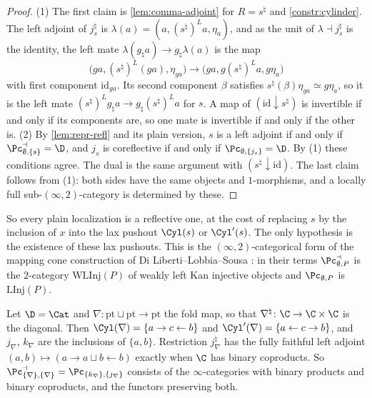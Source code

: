 \begin{proof}
(1) The first claim is \cref{lem:comma-adjoint} for $R = s^{\natural}$ and \cref{constr:cylinder}. The left adjoint of $j_{s}^{\natural}$ is $\lambda(a) = (a,(s^{\natural})^{L}a,\eta_{a})$, and as the unit of $\lambda \dashv j_{s}^{\natural}$ is the identity, the left mate $\lambda(g_{\natural}a) \to g_{\natural}\lambda(a)$ is the map
\[
\bigl(ga,(s^{\natural})^{L}(ga),\eta_{ga}\bigr) \to \bigl(ga,g(s^{\natural})^{L}a,g\eta_{a}\bigr)
\]
with first component $\mathrm{id}_{ga}$. Its second component $\beta$ satisfies $s^{\natural}(\beta)\eta_{ga} \simeq g\eta_{a}$, so it is the left mate $(s^{\natural})^{L}g_{\natural}a \to g_{\natural}(s^{\natural})^{L}a$ for $s$. A map of $(\mathrm{id} \downarrow s^{\natural})$ is invertible if and only if its components are, so one mate is invertible if and only if the other is.
(2) By \cref{lem:repr-refl} and its plain version, $s$ is a left adjoint if and only if $\Pc^{\dashv}_{\emptyset,\{s\}} = \D$, and $j_{s}$ is coreflective if and only if $\Pc_{\emptyset,\{j_{s}\}} = \D$. By (1) these conditions agree.
The dual is the same argument with $(s^{\natural} \downarrow \mathrm{id})$. The last claim follows from (1): both sides have the same objects and $1$-morphisms, and a locally full sub-$(\infty,2)$-category is determined by these.
\end{proof}

So every plain localization is a reflective one, at the cost of replacing $s$ by the inclusion of $x$ into the lax pushout $\Cyl(s)$ or $\Cyl'(s)$. The only hypothesis is the existence of these lax pushouts.
This is the $(\infty,2)$-categorical form of the mapping cone construction of Di Liberti--Lobbia--Sousa \cite[Proposition 1.14]{dilibertilobbiasousa2022kz}: in their terms $\Pc^{\dashv}_{\emptyset,P}$ is the $2$-category $\mathrm{WLInj}(P)$ of weakly left Kan injective objects and $\Pc_{\emptyset,P}$ is $\mathrm{LInj}(P)$.

\begin{exmp}
\label{ex:adjoin-products}
Let $\D = \Cat$ and $\nabla\colon \mathrm{pt} \sqcup \mathrm{pt} \to \mathrm{pt}$ the fold map, so that $\nabla^{\natural}\colon \C \to \C \times \C$ is the diagonal. Then $\Cyl(\nabla) = \{a \to c \leftarrow b\}$ and $\Cyl'(\nabla) = \{a \leftarrow c \to b\}$, and $j_{\nabla}$, $k_{\nabla}$ are the inclusions of $\{a,b\}$. Restriction $j_{\nabla}^{\natural}$ has the fully faithful left adjoint $(a,b) \mapsto (a \to a \sqcup b \leftarrow b)$ exactly when $\C$ has binary coproducts.
So $\Pc^{\dashv}_{\{\nabla\},\{\nabla\}} = \Pc_{\{k_{\nabla}\},\{j_{\nabla}\}}$ consists of the $\infty$-categories with binary products and binary coproducts, and the functors preserving both.
\end{exmp}

